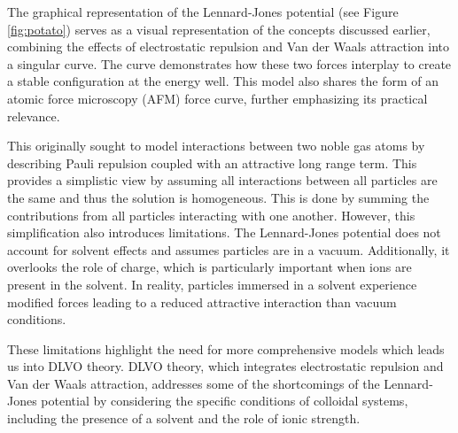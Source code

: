 The graphical representation of the Lennard-Jones potential (see Figure \ref{fig:potato}) serves as a visual representation of the concepts discussed earlier, combining the effects of electrostatic repulsion and Van der Waals attraction into a singular curve. The curve demonstrates how these two forces interplay to create a stable configuration at the energy well. This model also shares the form of an atomic force microscopy (AFM) force curve, further emphasizing its practical relevance. 


This originally sought to model interactions between two noble gas atoms by describing Pauli repulsion coupled with an attractive long range term. This provides a simplistic view by assuming all interactions between all particles are the same and thus the solution is homogeneous. This is done by summing the contributions from all particles interacting with one another. However, this simplification also introduces limitations. The Lennard-Jones potential does not account for solvent effects and assumes particles are in a vacuum. Additionally, it overlooks the role of charge, which is particularly important when ions are present in the solvent. In reality, particles immersed in a solvent experience modified forces leading to a reduced attractive interaction than vacuum conditions.
\cite{lilBlueBook}








These limitations highlight the need for more comprehensive models which leads us into DLVO theory. DLVO theory, which integrates electrostatic repulsion and Van der Waals attraction, addresses some of the shortcomings of the Lennard-Jones potential by considering the specific conditions of colloidal systems, including the presence of a solvent and the role of ionic strength.\cite{} %

